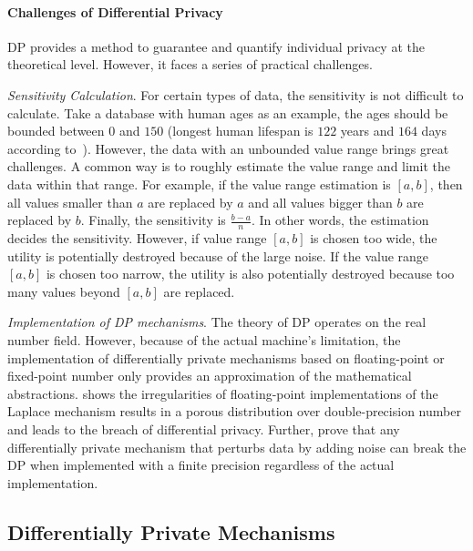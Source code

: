 \paragraph{Challenges of Differential Privacy}
\label{subsubsec:challengesOfDP}
DP provides a method to guarantee and quantify individual privacy at the theoretical level. However, it faces a series of practical challenges.

\emph{Sensitivity Calculation}. For certain types of data, the sensitivity is not difficult to calculate. Take a database with human ages as an example, the ages should be bounded between $0$ and $150$ (longest human lifespan is $122$ years and $164$ days according to~\cite{whitney_1997}). However, the data with an unbounded value range brings great challenges. A common way is to roughly estimate the value range and limit the data within that range. For example, if the value range estimation is $\left[ a,b\right] $, then all values smaller than $a$ are replaced by $a$ and all values bigger than $b$ are replaced by $b$. Finally,  the sensitivity is $\frac{b- a}{n}$. In other words, the estimation decides the sensitivity. However, if value range $\left[ a,b\right] $ is chosen too wide, the utility is potentially destroyed because of the large noise. If the value range $\left[ a,b\right] $ is chosen too narrow, the utility is also potentially destroyed because too many values beyond $\left[ a,b\right] $ are replaced.

\emph{Implementation of DP mechanisms}. The theory of DP operates on the real number field. However, because of the actual machine's limitation, the implementation of differentially private mechanisms based on floating-point or fixed-point number only provides an approximation of the mathematical abstractions. \cite{mironov2012significance} shows the irregularities of floating-point implementations of the Laplace mechanism results in a porous distribution over double-precision number and leads to the breach of differential privacy. Further, \cite{gazeau2016preserving} prove that any differentially private mechanism that perturbs data by adding noise can break the DP when implemented with a finite precision regardless of the actual implementation.

\subsection{Differentially Private Mechanisms}
\label{subsec:DPMechanisms}

